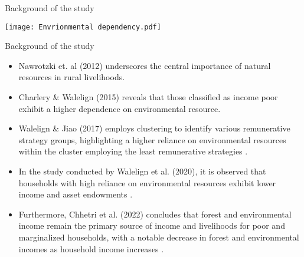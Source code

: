 \documentclass{beamer}
\newcommand{\coloredcite}[2]{\textcolor{blue}{\cite{#2}}}
\begin{document}
	\begin{frame}[t]{Background of the study}
		\begin{center}        \texttt{[image: Envrionmental dependency.pdf]}
		\end{center}
	\end{frame}
	
	\begin{frame}[t]{Background of the study}
		\begin{itemize}
			\item \begin{justify} \small Nawrotzki  et. al (2012) \small\coloredcite{}{r9} underscores the central importance of natural resources in rural livelihoods. 
			\end{justify}
			\item \begin{justify}
				\small Charlery \& Walelign (2015) \small\coloredcite{}{r11} reveals that those classified as income poor exhibit a higher dependence on environmental resource.
			\end{justify}
			\item \begin{justify}
				\small Walelign & Jiao (2017) employs clustering to identify various remunerative strategy groups, highlighting a higher reliance on environmental resources within the cluster employing the least remunerative strategies \small\coloredcite{}{r12}.
			\end{justify}
			\item \begin{justify}
				\small In the study conducted by Walelign et al. (2020), it is observed that households with high reliance on environmental resources exhibit lower income and asset endowments \small\coloredcite{}{r13}.
			\end{justify}
			\item \begin{justify}
				\small Furthermore, Chhetri et al. (2022) concludes that forest and environmental income remain the primary source of income and livelihoods for poor and marginalized households, with a  notable decrease in forest and environmental incomes as household income increases \small\coloredcite{}{r14}. 
			\end{justify}
		\end{itemize}
	\end{frame}
	
\end{document}

